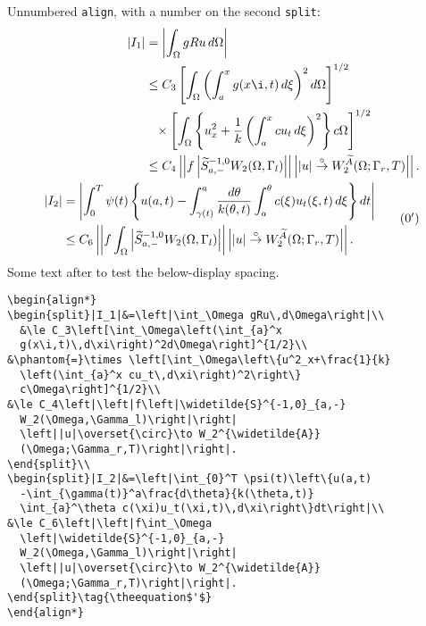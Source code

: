 
\newpage
Unnumbered {\tt align}, with a number on the second {\tt split}:
\begin{align*}
\begin{split}|I_1|&=\left|\int_\Omega gRu\,d\Omega\right|\\
  &\le C_3\left[\int_\Omega\left(\int_{a}^x
  g(x\i,t)\,d\xi\right)^2d\Omega\right]^{1/2}\\
&\phantom{=}\times \left[\int_\Omega\left\{u^2_x+\frac{1}{k}
  \left(\int_{a}^x cu_t\,d\xi\right)^2\right\}
  c\Omega\right]^{1/2}\\
&\le C_4\left|\left|f\left|\widetilde{S}^{-1,0}_{a,-}
  W_2(\Omega,\Gamma_l)\right|\right|
  \left||u|\overset{\circ}\to W_2^{\widetilde{A}}
  (\Omega;\Gamma_r,T)\right|\right|.
\end{split}\\
\begin{split}|I_2|&=\left|\int_{0}^T \psi(t)\left\{u(a,t)
  -\int_{\gamma(t)}^a\frac{d\theta}{k(\theta,t)}
  \int_{a}^\theta c(\xi)u_t(\xi,t)\,d\xi\right\}dt\right|\\
&\le C_6\left|\left|f\int_\Omega
  \left|\widetilde{S}^{-1,0}_{a,-}
  W_2(\Omega,\Gamma_l)\right|\right|
  \left||u|\overset{\circ}\to W_2^{\widetilde{A}}
  (\Omega;\Gamma_r,T)\right|\right|.
\end{split}\tag{\theequation$'$}
\end{align*}
Some text after to test the below-display spacing.

\begin{verbatim}
\begin{align*}
\begin{split}|I_1|&=\left|\int_\Omega gRu\,d\Omega\right|\\
  &\le C_3\left[\int_\Omega\left(\int_{a}^x
  g(x\i,t)\,d\xi\right)^2d\Omega\right]^{1/2}\\
&\phantom{=}\times \left[\int_\Omega\left\{u^2_x+\frac{1}{k}
  \left(\int_{a}^x cu_t\,d\xi\right)^2\right\}
  c\Omega\right]^{1/2}\\
&\le C_4\left|\left|f\left|\widetilde{S}^{-1,0}_{a,-}
  W_2(\Omega,\Gamma_l)\right|\right|
  \left||u|\overset{\circ}\to W_2^{\widetilde{A}}
  (\Omega;\Gamma_r,T)\right|\right|.
\end{split}\\
\begin{split}|I_2|&=\left|\int_{0}^T \psi(t)\left\{u(a,t)
  -\int_{\gamma(t)}^a\frac{d\theta}{k(\theta,t)}
  \int_{a}^\theta c(\xi)u_t(\xi,t)\,d\xi\right\}dt\right|\\
&\le C_6\left|\left|f\int_\Omega
  \left|\widetilde{S}^{-1,0}_{a,-}
  W_2(\Omega,\Gamma_l)\right|\right|
  \left||u|\overset{\circ}\to W_2^{\widetilde{A}}
  (\Omega;\Gamma_r,T)\right|\right|.
\end{split}\tag{\theequation$'$}
\end{align*}
\end{verbatim}

